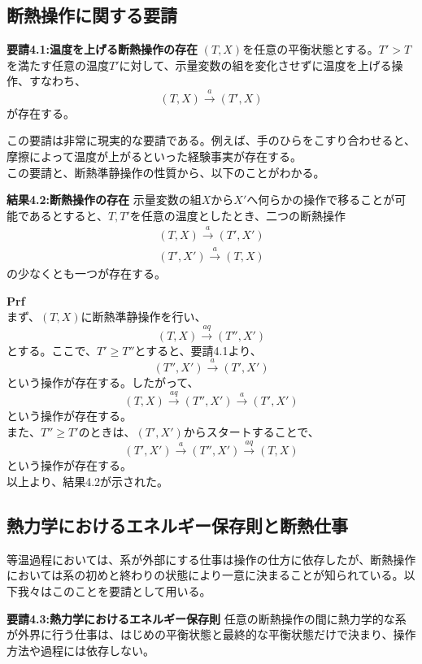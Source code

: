 \documentclass[a4paper,11pt]{jsarticle}
\begin{document}
\subsection{断熱操作に関する要請}
\begin{itembox}[l]{\textbf{要請4.1:温度を上げる断熱操作の存在}}
    $(T,X)$を任意の平衡状態とする。$T'>T$を満たす任意の温度$T'$に対して、示量変数の組を変化させずに温度を上げる操作、すなわち、
    \begin{equation}
        (T,X) \xrightarrow{a} (T',X)
    \end{equation}
    が存在する。
\end{itembox}
この要請は非常に現実的な要請である。例えば、手のひらをこすり合わせると、摩擦によって温度が上がるといった経験事実が存在する。\\
この要請と、断熱準静操作の性質から、以下のことがわかる。\\
\begin{itembox}[l]{\textbf{結果4.2:断熱操作の存在}}
    示量変数の組$X$から$X'$へ何らかの操作で移ることが可能であるとすると、$T,T'$を任意の温度としたとき、二つの断熱操作
    \begin{align}
        (T,X) \xrightarrow{a} (T',X')\\
        (T',X') \xrightarrow{a} (T,X)
    \end{align}
    の少なくとも一つが存在する。
\end{itembox}
\textbf{Prf}\\
まず、$(T,X)$に断熱準静操作を行い、
\begin{equation}
    (T,X) \xrightarrow{aq} (T'',X')
\end{equation}
とする。ここで、$T'\geq T''$とすると、要請4.1より、
\begin{equation}
    (T'',X') \xrightarrow{a} (T',X')
\end{equation}
という操作が存在する。したがって、
\begin{equation}
    (T,X) \xrightarrow{aq} (T'',X') \xrightarrow{a} (T',X')
\end{equation}
という操作が存在する。\\
また、$T''\geq T'$のときは、$(T',X') $からスタートすることで、
\begin{equation}
    (T',X') \xrightarrow{a} (T'',X') \xrightarrow{aq} (T,X)
\end{equation}
という操作が存在する。\\
以上より、結果4.2が示された。\\

\subsection{熱力学におけるエネルギー保存則と断熱仕事}
等温過程においては、系が外部にする仕事は操作の仕方に依存したが、断熱操作においては系の初めと終わりの状態により一意に決まることが知られている。以下我々はこのことを要請として用いる。\\
\begin{itembox}[l]{\textbf{要請4.3:熱力学におけるエネルギー保存則}}
    任意の断熱操作の間に熱力学的な系が外界に行う仕事は、はじめの平衡状態と最終的な平衡状態だけで決まり、操作方法や過程には依存しない。
\end{itembox}
\end{document}
